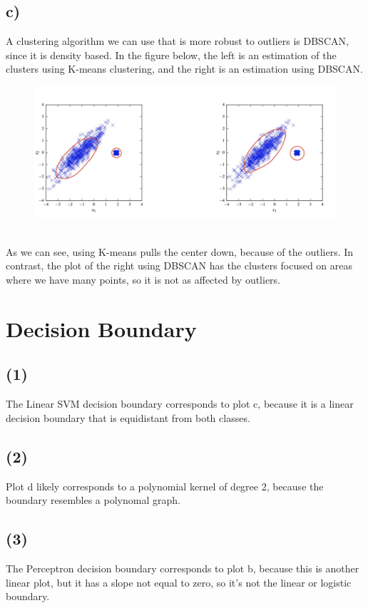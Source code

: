 \documentclass[12pt, letterpaper]{article}
\begin{document}
\subsection*{c)} A clustering algorithm we can use that is more robust to outliers is DBSCAN, since it is density based. In the figure below, the left is an estimation of the clusters using K-means clustering, and the right is an estimation using DBSCAN. \\
\begin{figure}[h!]
  \includegraphics[scale=0.3]{./images/5c.jpeg}
\end{figure} \\
As we can see, using K-means pulls the center down, because of the outliers. In contrast, the plot of the right using DBSCAN has the clusters focused on areas where we have many points, so it is not as affected by outliers.


\newpage
\section{Decision Boundary}

\subsection*{(1)} The Linear SVM decision boundary corresponds to plot c, because it is a linear decision boundary that is equidistant from both classes.

\subsection*{(2)} Plot d likely corresponds to a polynomial kernel of degree 2, because the boundary resembles a polynomal graph.

\subsection*{(3)} The Perceptron decision boundary corresponds to plot b, because this is another linear plot, but it has a slope not equal to zero, so it's not the linear or logistic boundary.
\end{document}
